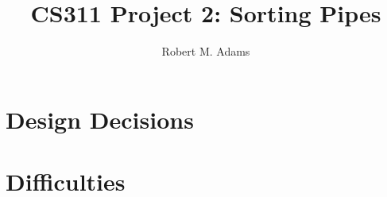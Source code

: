 \documentclass[letterpaper,10pt]{article} %
\begin{document}
  \title{CS311 Project 2: Sorting Pipes}
  \author{Robert M. Adams}
  \maketitle


\section{Design Decisions}




\section{Difficulties}





  \begin{figure}[p]
    \centering
    
    \label{runtimes}
  \end{figure}
\end{document}
